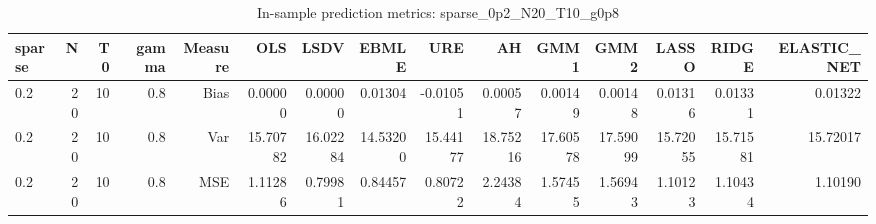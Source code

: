 \begin{table}[!htbp]\centering
\caption{In-sample prediction metrics: sparse_0p2_N20_T10_g0p8}
\label{tab:table2_sparse_0p2_N20_T10_g0p8}
\begin{tabular}{lrrrrrrrrrrrrrr}
\hline
sparse & N & T0 & gamma & Measure & OLS & LSDV & EBMLE & URE & AH & GMM1 & GMM2 & LASSO & RIDGE & ELASTIC_NET \\
\hline
0.2 & 20 & 10 & 0.8 & Bias & 0.00000 & 0.00000 & 0.01304 & -0.01051 & 0.00057 & 0.00149 & 0.00148 & 0.01316 & 0.01331 & 0.01322 \\
0.2 & 20 & 10 & 0.8 & Var & 15.70782 & 16.02284 & 14.53200 & 15.44177 & 18.75216 & 17.60578 & 17.59099 & 15.72055 & 15.71581 & 15.72017 \\
0.2 & 20 & 10 & 0.8 & MSE & 1.11286 & 0.79981 & 0.84457 & 0.80722 & 2.24384 & 1.57455 & 1.56943 & 1.10123 & 1.10434 & 1.10190 \\
\hline
\end{tabular}
\end{table}

